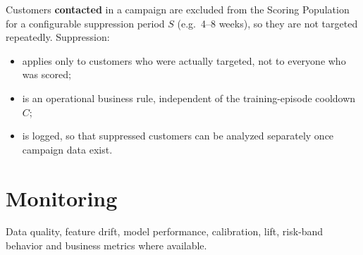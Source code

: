 Customers \textbf{contacted} in a campaign are excluded from the Scoring Population for a configurable suppression period $S$ (e.g.\ 4--8 weeks), so they are not targeted repeatedly. Suppression:

\begin{itemize}
    \item applies only to customers who were actually targeted, not to everyone who was scored;
    \item is an operational business rule, independent of the training-episode cooldown $C$;
    \item is logged, so that suppressed customers can be analyzed separately once campaign data exist.
\end{itemize}

\section{Monitoring}
\label{sec:8-6}

Data quality, feature drift, model performance, calibration, lift, risk-band behavior and business metrics where available.
